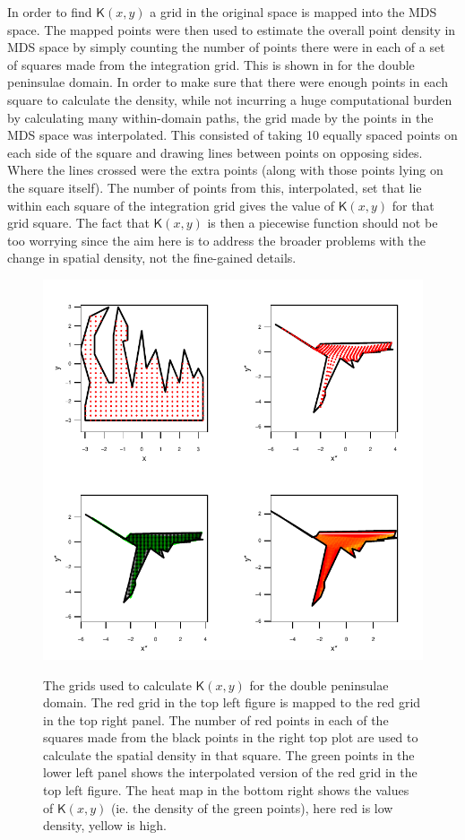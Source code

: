 In order to find $\mathsf{K}(x,y)$ a grid in the original space is mapped into the MDS space. The mapped points were then used to estimate the overall point density in MDS space by simply counting the number of points there were in each of a set of squares made from the integration grid. This is shown in  for the double peninsulae domain. In order to make sure that there were enough points in each square to calculate the density, while not incurring a huge computational burden by calculating many within-domain paths, the grid made by the points in the MDS space was interpolated. This consisted of taking 10 equally spaced points on each side of the square and drawing lines between points on opposing sides. Where the lines crossed were the extra points (along with those points lying on the square itself). The number of points from this, interpolated, set that lie within each square of the integration grid gives the value of $\mathsf{K}(x,y)$ for that grid square. The fact that $\mathsf{K}(x,y)$ is then a piecewise function should not be too worrying since the aim here is to address the broader problems with the change in spatial density, not the fine-gained details.

\begin{figure}
\centering
\includegraphics{mds/figs/densgrid.pdf} \\
\caption{The grids used to calculate $\mathsf{K}(x,y)$ for the double peninsulae domain. The red grid in the top left figure is mapped to the red grid in the top right panel. The number of red points in each of the squares made from the black points in the right top plot are used to calculate the spatial density in that square. The green points in the lower left panel shows the interpolated version of the red grid in the top left figure. The heat map in the bottom right shows the values of $\mathsf{K}(x,y)$ (ie. the density of the green points), here red is low density, yellow is high.}
\label{densgrid}
\end{figure}

